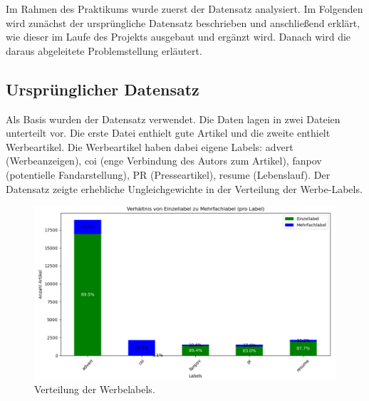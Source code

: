 
Im Rahmen des Praktikums wurde zuerst der Datensatz analysiert. Im Folgenden wird zunächst der ursprüngliche Datensatz beschrieben und anschließend erklärt, wie dieser im Laufe des Projekts ausgebaut und ergänzt wird. Danach wird die daraus abgeleitete Problemstellung erläutert.

\subsection{Ursprünglicher Datensatz}
\label{UrsprunglicherDatensatz}
Als Basis wurden der Datensatz \cite{Urbanbricks2020} verwendet. Die Daten lagen in zwei Dateien unterteilt vor. Die erste Datei enthielt gute Artikel und die zweite enthielt %
Werbeartikel. Die Werbeartikel haben dabei eigene Labels: advert (Werbeanzeigen), coi (enge Verbindung des Autors zum Artikel), fanpov (potentielle Fandarstellung), PR  (Presseartikel), resume (Lebenslauf).
Der Datensatz zeigte erhebliche Ungleichgewichte in der Verteilung der Werbe-Labels.

\begin{figure}[H]
    \centering
    \includegraphics[width=0.7\linewidth]{Praktikumsbericht/figures/labelverteilung.png}
    \caption{Verteilung der Werbelabels.}
    \label{fig:labelverteilung}
\end{figure}

